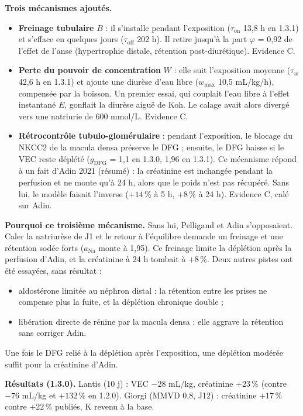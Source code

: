 \documentclass[10pt,a4paper]{article}
\begin{document}
\textbf{Trois mécanismes ajoutés.}
\begin{itemize}
\item \textbf{Freinage tubulaire} $B$ : il s'installe pendant l'exposition ($\tau_\mathrm{on}$ 13,8 h en 1.3.1) et s'efface en quelques jours ($\tau_\mathrm{off}$ 202 h). Il retire jusqu'à la part $\varphi$ = 0,92 de l'effet de l'anse (hypertrophie distale, rétention post-diurétique). Evidence C.
\item \textbf{Perte du pouvoir de concentration} $W$ : elle suit l'exposition moyenne ($\tau_w$ 42,6 h en 1.3.1) et ajoute une diurèse d'eau libre ($w_\mathrm{max}$ 10,5 mL/kg/h), compensée par la boisson. Un premier essai, qui couplait l'eau libre à l'effet instantané $E$, gonflait la diurèse aiguë de Koh. Le calage avait alors divergé vers une natriurie de 600 mmol/L. Evidence C.
\item \textbf{Rétrocontrôle tubulo-glomérulaire} : pendant l'exposition, le blocage du NKCC2 de la macula densa préserve le DFG ; ensuite, le DFG baisse si le VEC reste déplété ($g_\mathrm{DFG}$ = 1,1 en 1.3.0, 1,96 en 1.3.1). Ce mécanisme répond à un fait d'Adin 2021 (résumé) : la créatinine est inchangée pendant la perfusion et ne monte qu'à 24 h, alors que le poids n'est pas récupéré. Sans lui, le modèle faisait l'inverse ($+14$\,\% à 5 h, $+8$\,\% à 24 h). Evidence C, calé sur Adin.
\end{itemize}

\textbf{Pourquoi ce troisième mécanisme.} Sans lui, Pelligand et Adin s'opposaient. Caler la natriurèse de J1 et le retour à l'équilibre demande un freinage et une rétention sodée forts ($a_\mathrm{Na}$ monte à 1,95). Ce freinage limite la déplétion après la perfusion d'Adin, et la créatinine à 24 h tombait à $+8$\,\%. Deux autres pistes ont été essayées, sans résultat :
\begin{itemize}
\item aldostérone limitée au néphron distal : la rétention entre les prises ne compense plus la fuite, et la déplétion chronique double ;
\item libération directe de rénine par la macula densa : elle aggrave la rétention sans corriger Adin.
\end{itemize}
Une fois le DFG relié à la déplétion après l'exposition, une déplétion modérée suffit pour la créatinine d'Adin.

\textbf{Résultats (1.3.0).} Lantis (10 j) : VEC $-28$ mL/kg, créatinine $+23$\,\% (contre $-76$ mL/kg et $+132$\,\% en 1.2.0). Giorgi (MMVD 0,8, J12) : créatinine $+17$\,\% contre $+22$\,\% publiés, K revenu à la base.
\end{document}
